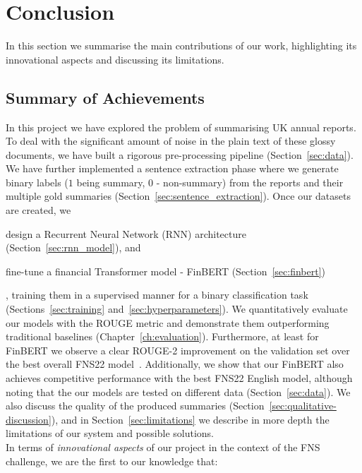 \newpage

\chapter{Conclusion}\label{ch:conclusion}
In this section we summarise the main contributions of our work, highlighting its innovational aspects and discussing its limitations.

\section{Summary of Achievements}\label{sec:summary}
In this project we have explored the problem of summarising UK annual reports.
To deal with the significant amount of noise in the plain text of these glossy documents, we have built a rigorous pre-processing pipeline (Section~\ref{sec:data}).
We have further implemented a sentence extraction phase where we generate binary labels ($1$ being summary, $0$ - non-summary) from the reports and their multiple gold summaries (Section~\ref{sec:sentence_extraction}).
Once our datasets are created, we
\begin{enumerate*}[label=(\alph*)]
    \item design a Recurrent Neural Network (RNN) architecture (Section~\ref{sec:rnn_model}), and
    \item fine-tune a financial Transformer model - FinBERT (Section~\ref{sec:finbert})
\end{enumerate*},
training them in a supervised manner for a binary classification task (Sections~\ref{sec:training} and~\ref{sec:hyperparameters}).
We quantitatively evaluate our models with the ROUGE metric and demonstrate them outperforming traditional baselines (Chapter~\ref{ch:evaluation}).
Furthermore, at least for FinBERT we observe a clear ROUGE-2 improvement on the validation set over the best overall FNS22 model~\cite{foroutan-etal-2022-multilingual}.
Additionally, we show that our FinBERT also achieves competitive performance with the best FNS22 English model,
although noting that the our models are tested on different data (Section~\ref{sec:data}).
We also discuss the quality of the produced summaries (Section~\ref{sec:qualitative-discussion}), and in
Section~\ref{sec:limitations} we describe in more depth the limitations of our system and possible solutions.
\\
In terms of \emph{innovational aspects} of our project in the context of the FNS challenge, we are the first to our knowledge that:
